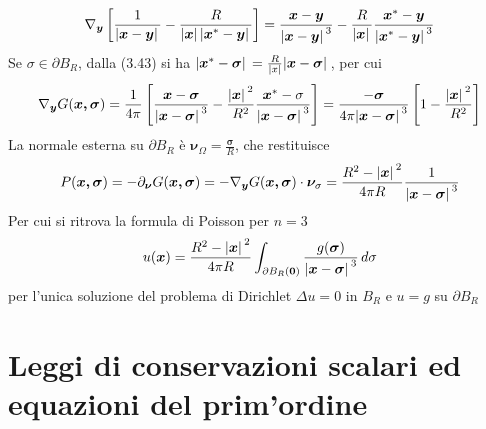 \documentclass[a4paper,12pt, draft]{article}
\theoremstyle{break}
\numberwithin{equation}{section}
\begin{document}
\[
\nabla_{\bm{y}}\left[ \frac{1}{\abs*{\bm{x} - \bm{y}}} - \frac{R}{\abs*{\bm{x}} \abs*{\bm{x}^* - \bm{y}}}\right] = \frac{\bm{x} - \bm{y}}{\abs*{\bm{x} -\bm{y}}^3} - \frac{R}{\abs*{\bm{x}}} \frac{\bm{x}^* - \bm{y}}{\abs*{\bm{x}^* - \bm{y}}^3}
\]
Se \(\sigma \in \partial B_R\), dalla (3.43) si ha \(\abs*{\bm{x}^* - \bm{\sigma}} = \frac{R}{\abs*{x}}\abs*{\bm{x}- \bm{\sigma}}\), per cui 
\[
  \nabla_{\bm{y}} G(\bm{x, \sigma}) = \frac{1}{4\pi} \left[ \frac{\bm{x} - \bm{\sigma}}{\abs*{\bm{x} - \bm{\sigma}}^3} - \frac{\abs*{\bm{x}}^2}{R^2} \frac{\bm{x}^* - \sigma}{\abs*{\bm{x} - \bm{\sigma}}^3} \right] = \frac{-\bm{\sigma}}{4\pi \abs*{\bm{x} - \bm{\sigma}}^3} \left[1 - \frac{\abs*{\bm{x}}^2}{R^2}\right]
\]
La normale esterna su \(\partial B_R\) è \(\bm{\nu}_{\Omega} = \frac{\bm{\sigma}}{R}\), che restituisce
\[
  P(\bm{x, \sigma}) = -\partial_{\bm{\nu}}G(\bm{x, \sigma}) = -\nabla_{\bm{y}}G(\bm{x, \sigma}) \cdot \bm{\nu}_{\sigma} = \frac{R^2 - \abs*{\bm{x}}^2}{4\pi R} \frac{1}{\abs*{\bm{x} - \bm{\sigma}}^3}
\]
Per cui si ritrova la formula di Poisson per \(n = 3\)
\begin{equation}
  u(\bm{x}) = \frac{R^2 - \abs*{\bm{x}}^2}{4\pi R} \int_{\partial B_R(\bm{0})} \frac{g(\bm{\sigma})}{\abs*{\bm{x} - \bm{\sigma}}^3} \, d\sigma
\end{equation}
per l'unica soluzione del problema di Dirichlet \(\Delta u = 0\) in \(B_R\) e \(u = g\) su \(\partial B_R\)
\section{Leggi di conservazioni scalari ed equazioni del prim'ordine} 
\end{document}
